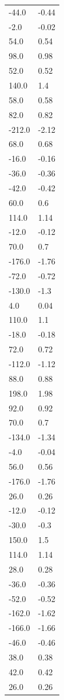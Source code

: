 \begin{longtable}{ll}
-44.0 & -0.44 \\
-2.0 & -0.02 \\
54.0 & 0.54 \\
98.0 & 0.98 \\
52.0 & 0.52 \\
140.0 & 1.4 \\
58.0 & 0.58 \\
82.0 & 0.82 \\
-212.0 & -2.12 \\
68.0 & 0.68 \\
-16.0 & -0.16 \\
-36.0 & -0.36 \\
-42.0 & -0.42 \\
60.0 & 0.6 \\
114.0 & 1.14 \\
-12.0 & -0.12 \\
70.0 & 0.7 \\
-176.0 & -1.76 \\
-72.0 & -0.72 \\
-130.0 & -1.3 \\
4.0 & 0.04 \\
110.0 & 1.1 \\
-18.0 & -0.18 \\
72.0 & 0.72 \\
-112.0 & -1.12 \\
88.0 & 0.88 \\
198.0 & 1.98 \\
92.0 & 0.92 \\
70.0 & 0.7 \\
-134.0 & -1.34 \\
-4.0 & -0.04 \\
56.0 & 0.56 \\
-176.0 & -1.76 \\
26.0 & 0.26 \\
-12.0 & -0.12 \\
-30.0 & -0.3 \\
150.0 & 1.5 \\
114.0 & 1.14 \\
28.0 & 0.28 \\
-36.0 & -0.36 \\
-52.0 & -0.52 \\
-162.0 & -1.62 \\
-166.0 & -1.66 \\
-46.0 & -0.46 \\
38.0 & 0.38 \\
42.0 & 0.42 \\
26.0 & 0.26 \\

\end{longtable}
